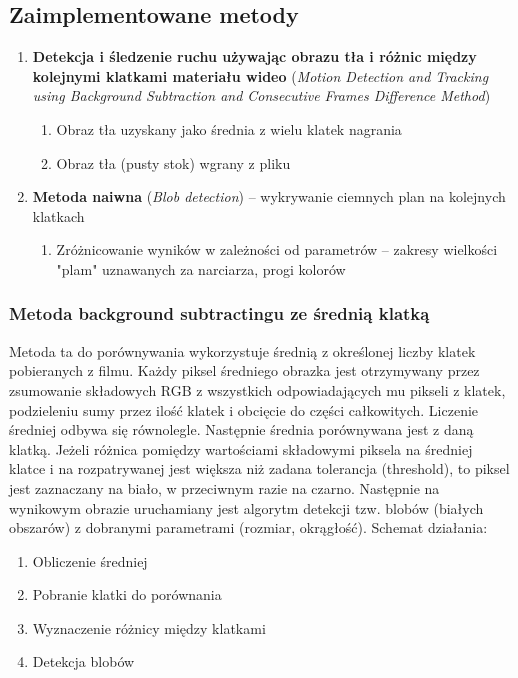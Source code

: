 \documentclass[a4paper]{article}
\begin{document}
\subsection{Zaimplementowane metody}
\label{sec:Methods}
\begin{enumerate}
\item \textbf{Detekcja i śledzenie ruchu używając obrazu tła i różnic między kolejnymi klatkami materiału wideo} (\textit{Motion Detection and Tracking using Background Subtraction and Consecutive Frames Difference Method})
	\begin{enumerate}
	\item Obraz tła uzyskany jako średnia z wielu klatek nagrania
	\item Obraz tła (pusty stok) wgrany z pliku
	\end{enumerate}
\item \textbf{Metoda naiwna} (\textit{Blob detection}) – wykrywanie ciemnych plan na kolejnych klatkach
	\begin{enumerate}
	\item Zróżnicowanie wyników w zależności od parametrów – zakresy wielkości "plam" uznawanych za narciarza, progi kolorów
	\end{enumerate}
\end{enumerate}	

\subsubsection{Metoda background subtractingu ze średnią klatką}
Metoda ta do porównywania wykorzystuje średnią z określonej liczby klatek pobieranych z filmu. Każdy piksel średniego obrazka jest otrzymywany przez zsumowanie składowych RGB z wszystkich odpowiadających mu pikseli z klatek, podzieleniu sumy przez ilość klatek i obcięcie do części całkowitych. Liczenie średniej odbywa się równolegle. Następnie średnia porównywana jest z daną klatką. Jeżeli różnica pomiędzy wartościami składowymi piksela na średniej klatce i na rozpatrywanej jest większa niż zadana tolerancja (threshold), to piksel jest zaznaczany na biało, w przeciwnym razie na czarno. Następnie na wynikowym obrazie uruchamiany jest algorytm detekcji tzw. blobów (białych obszarów) z dobranymi parametrami (rozmiar, okrągłość).
Schemat działania:
\begin{enumerate}
\item Obliczenie średniej
\item Pobranie klatki do porównania
\item Wyznaczenie różnicy między klatkami
\item Detekcja blobów
\end{enumerate}
\end{document}
